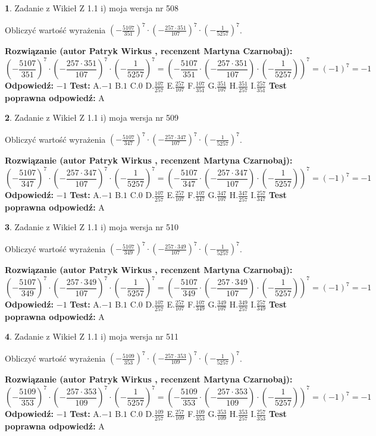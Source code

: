 \documentclass[12pt, a4paper]{article}
\theoremstyle{definition} %
\newtheorem{zad}{}
\newcommand{\zadStart}[1]{\begin{zad}#1\newline}
\newcommand{\zadStop}{\end{zad}}
\newcommand{\rozwStart}[2]{\noindent \textbf{Rozwiązanie (autor #1 , recenzent #2): }\newline}
\newcommand{\rozwStop}{\newline}
\newcommand{\odpStart}{\noindent \textbf{Odpowiedź:}\newline}
\newcommand{\odpStop}{\newline}
\newcommand{\testStart}{\noindent \textbf{Test:}\newline}
\newcommand{\testStop}{\newline}
\newcommand{\kluczStart}{\noindent \textbf{Test poprawna odpowiedź:}\newline}
\newcommand{\kluczStop}{\newline}
\begin{document}
\zadStart{Zadanie z Wikieł Z 1.1 i) moja wersja nr 508}

Obliczyć wartość wyrażenia $(-\frac{5107}{351})^{7} \cdot (-\frac{257 \cdot 351}{107})^{7} \cdot (-\frac{1}{5257})^{7}$.
\zadStop
\rozwStart{Patryk Wirkus}{Martyna Czarnobaj}
$$(-\frac{5107}{351})^{7} \cdot (-\frac{257 \cdot 351}{107})^{7} \cdot (-\frac{1}{5257})^{7} = (-\frac{5107}{351} \cdot (-\frac{257 \cdot 351}{107}) \cdot (-\frac{1}{5257}))^{7} = (-1)^{7} = -1$$
\rozwStop
\odpStart
$-1$
\odpStop
\testStart
A.$-1$ B.$1$ C.$0$ D.$\frac{107}{257}$ E.$\frac{257}{107}$
F.$\frac{107}{351}$ G.$\frac{351}{107}$
H.$\frac{351}{257}$
I.$\frac{257}{351}$
\testStop
\kluczStart
A
\kluczStop



\zadStart{Zadanie z Wikieł Z 1.1 i) moja wersja nr 509}

Obliczyć wartość wyrażenia $(-\frac{5107}{347})^{7} \cdot (-\frac{257 \cdot 347}{107})^{7} \cdot (-\frac{1}{5257})^{7}$.
\zadStop
\rozwStart{Patryk Wirkus}{Martyna Czarnobaj}
$$(-\frac{5107}{347})^{7} \cdot (-\frac{257 \cdot 347}{107})^{7} \cdot (-\frac{1}{5257})^{7} = (-\frac{5107}{347} \cdot (-\frac{257 \cdot 347}{107}) \cdot (-\frac{1}{5257}))^{7} = (-1)^{7} = -1$$
\rozwStop
\odpStart
$-1$
\odpStop
\testStart
A.$-1$ B.$1$ C.$0$ D.$\frac{107}{257}$ E.$\frac{257}{107}$
F.$\frac{107}{347}$ G.$\frac{347}{107}$
H.$\frac{347}{257}$
I.$\frac{257}{347}$
\testStop
\kluczStart
A
\kluczStop



\zadStart{Zadanie z Wikieł Z 1.1 i) moja wersja nr 510}

Obliczyć wartość wyrażenia $(-\frac{5107}{349})^{7} \cdot (-\frac{257 \cdot 349}{107})^{7} \cdot (-\frac{1}{5257})^{7}$.
\zadStop
\rozwStart{Patryk Wirkus}{Martyna Czarnobaj}
$$(-\frac{5107}{349})^{7} \cdot (-\frac{257 \cdot 349}{107})^{7} \cdot (-\frac{1}{5257})^{7} = (-\frac{5107}{349} \cdot (-\frac{257 \cdot 349}{107}) \cdot (-\frac{1}{5257}))^{7} = (-1)^{7} = -1$$
\rozwStop
\odpStart
$-1$
\odpStop
\testStart
A.$-1$ B.$1$ C.$0$ D.$\frac{107}{257}$ E.$\frac{257}{107}$
F.$\frac{107}{349}$ G.$\frac{349}{107}$
H.$\frac{349}{257}$
I.$\frac{257}{349}$
\testStop
\kluczStart
A
\kluczStop



\zadStart{Zadanie z Wikieł Z 1.1 i) moja wersja nr 511}

Obliczyć wartość wyrażenia $(-\frac{5109}{353})^{7} \cdot (-\frac{257 \cdot 353}{109})^{7} \cdot (-\frac{1}{5257})^{7}$.
\zadStop
\rozwStart{Patryk Wirkus}{Martyna Czarnobaj}
$$(-\frac{5109}{353})^{7} \cdot (-\frac{257 \cdot 353}{109})^{7} \cdot (-\frac{1}{5257})^{7} = (-\frac{5109}{353} \cdot (-\frac{257 \cdot 353}{109}) \cdot (-\frac{1}{5257}))^{7} = (-1)^{7} = -1$$
\rozwStop
\odpStart
$-1$
\odpStop
\testStart
A.$-1$ B.$1$ C.$0$ D.$\frac{109}{257}$ E.$\frac{257}{109}$
F.$\frac{109}{353}$ G.$\frac{353}{109}$
H.$\frac{353}{257}$
I.$\frac{257}{353}$
\testStop
\kluczStart
A
\kluczStop
\end{document}
